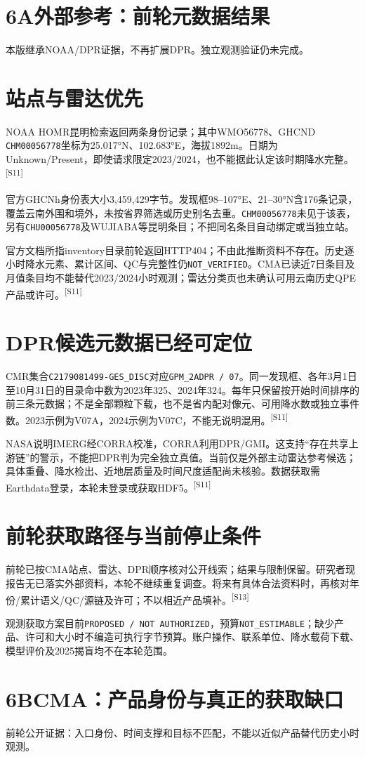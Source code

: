 \documentclass[UTF8,10.5pt,a4paper,fontset=none]{ctexart}
\newcommand{\evi}[1]{\textsuperscript{\color{muted}[#1]}}
\newcommand{\pageheading}[2]{\clearpage\section*{#1}\textcolor{muted}{#2}\par\vspace{3pt}}
\begin{document}
\pageheading{6A\quad 外部参考：前轮元数据结果}{本版继承NOAA/DPR证据，不再扩展DPR。独立观测验证仍未完成。}
\section*{站点与雷达优先}
NOAA HOMR昆明检索返回两条身份记录；其中WMO56778、GHCND \texttt{CHM00056778}坐标为25.017°N、102.683°E，海拔1892m。日期为Unknown/Present，即使请求限定2023/2024，也不能据此认定该时期降水完整。\evi{S11}

官方GHCNh身份表大小3,459,429字节。发现框98--107°E、21--30°N含176条记录，覆盖云南外围和境外，未按省界筛选或历史别名去重。\texttt{CHM00056778}未见于该表，另有\texttt{CHU00056778}及WUJIABA等昆明条目；不把同名条目自动绑定或当独立站。

官方文档所指inventory目录前轮返回HTTP404；不由此推断资料不存在。历史逐小时降水元素、累计区间、QC与完整性仍\texttt{NOT\_VERIFIED}。CMA已读近7日条目及月值条目均不能替代2023/2024小时观测；雷达分类页也未确认可用云南历史QPE产品或许可。\evi{S11}

\section*{DPR候选元数据已经可定位}
CMR集合\texttt{C2179081499-GES\_DISC}对应\texttt{GPM\_2ADPR / 07}。同一发现框、各年3月1日至10月31日的目录命中数为2023年325、2024年324。每年只保留按开始时间排序的前三条元数据；不是全部颗粒下载，也不是省内配对像元、可用降水数或独立事件数。2023示例为V07A，2024示例为V07C，不能无说明混用。\evi{S11}

NASA说明IMERG经CORRA校准，CORRA利用DPR/GMI。这支持“存在共享上游链”的警示，不能把DPR判为完全独立真值。当前仅是外部主动雷达参考候选；具体重叠、降水检出、近地层质量及时间尺度适配尚未核验。数据获取需Earthdata登录，本轮未登录或获取HDF5。\evi{S11}

\section*{前轮获取路径与当前停止条件}
前轮已按CMA站点、雷达、DPR顺序核对公开线索；结果与限制保留。研究者现报告无已落实外部资料，本轮不继续重复调查。将来有具体合法资料时，再核对年份/累计语义/QC/源链及许可；不以相近产品填补。\evi{S13}

观测获取方案目前\texttt{PROPOSED / NOT AUTHORIZED}，预算\texttt{NOT\_ESTIMABLE}；缺少产品、许可和大小时不编造可执行字节预算。账户操作、联系单位、降水载荷下载、模型评价及2025揭盲均不在本轮范围。

\pageheading{6B\quad CMA：产品身份与真正的获取缺口}{前轮公开证据：入口身份、时间支撑和目标不匹配，不能以近似产品替代历史小时观测。}
\end{document}
